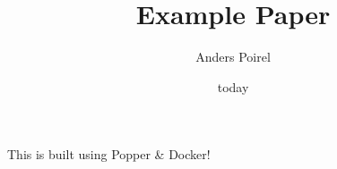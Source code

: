 \documentclass{article}[12pt]
\title{Example Paper}
\author{Anders Poirel}
\date{today}
\begin{document}
\maketitle

This is built using Popper \& Docker!
\end{document}
